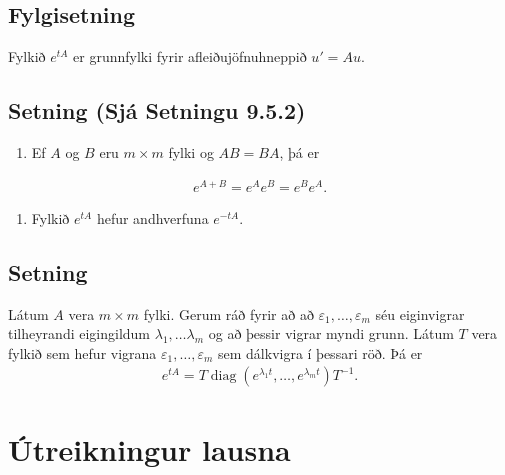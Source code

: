 \documentclass[a4paper,10pt,icelandic]{sphinxmanual}
\begin{document}
\subsection{Fylgisetning}
\label{\detokenize{Kafli09:fylgisetning}}
Fylkið \(e^{tA}\) er grunnfylki fyrir afleiðujöfnuhneppið \(u'=Au\).


\subsection{Setning (Sjá Setningu 9.5.2)}
\label{\detokenize{Kafli09:setning-sja-setningu-9-5-2}}\begin{enumerate}
%
\item {} 
Ef \(A\) og \(B\) eru \(m\times m\) fylki og \(AB=BA\), þá er

\end{enumerate}
\begin{equation*}
\begin{split}e^{A+B}=e^ Ae^ B=e^Be^A.\label{5.5.1}\end{split}
\end{equation*}\begin{enumerate}
%
\setcounter{enumi}{1}
\item {} 
Fylkið \(e^ {tA}\) hefur andhverfuna \(e^{-tA}\).

\end{enumerate}


\subsection{Setning}
\label{\detokenize{Kafli09:setning}}
Látum \(A\) vera \(m\times m\) fylki. Gerum ráð fyrir að að \(\varepsilon_1, \dots, \varepsilon_m\) séu eiginvigrar tilheyrandi eigingildum \(\lambda_1, \dots \lambda_m\) og að þessir vigrar myndi grunn. Látum \(T\) vera fylkið sem hefur vigrana \(\varepsilon_1, \dots, \varepsilon_m\) sem dálkvigra í þessari röð. Þá er
\begin{equation*}
\begin{split}e^{tA}=T{\operatorname{diag}}(e^{\lambda_1t}, \ldots, e^{\lambda_mt})T^{-1}.\end{split}
\end{equation*}

\section{Útreikningur lausna}
\label{\detokenize{Kafli09:utreikningur-lausna}}
\end{document}
